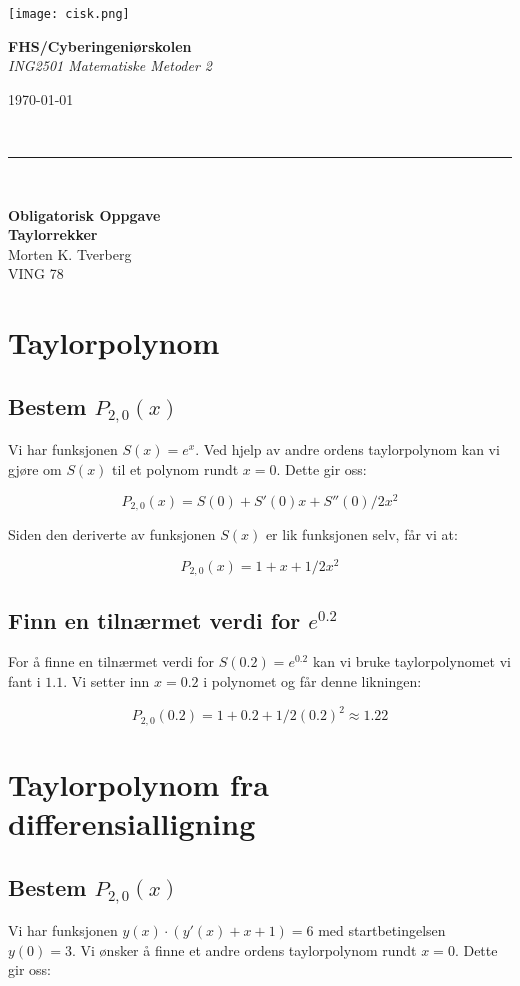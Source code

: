 \documentclass[12pt,a4paper]{article}
\def\frac#1#2{#1/#2}%
\newcommand{\institution}{FHS/Cyberingeniørskolen}
\newcommand{\coursecode}{ING2501 \; Matematiske Metoder 2}
\newcommand{\studentname}{Morten K. Tverberg}
\newcommand{\class}{VING 78}
\newcommand{\documenttitle}{Obligatorisk Oppgave}
\newcommand{\documentsubtitle}{Taylorrekker}
\newcommand{\makedoctitle}{%
  \thispagestyle{empty}
  \begin{minipage}{0.15\textwidth}
      \texttt{[image: cisk.png]}
  \end{minipage}%
  \begin{minipage}{0.5\textwidth}
      \vspace{10ex}
      {\bfseries \institution}\\
      {\itshape \coursecode}
  \end{minipage}%
  \begin{minipage}{0.3\textwidth}
      \vspace{13ex}
      \raggedleft
      \today 
  \end{minipage}\\[0.5ex]
  {\rule{\textwidth}{2pt}} \\ \vspace{3ex}

  \begin{center}
      {\Huge \bfseries \documenttitle} \\[1ex]
      {\LARGE \bfseries \documentsubtitle} \\[2ex]
      {\normalsize \studentname} \\[0.5ex]
      {\normalsize \class} \\[1ex]
  \end{center}

\clearpage
}
\begin{document}
\makedoctitle
{}
\setcounter{page}{1}

\tableofcontents
\clearpage

\section{Taylorpolynom}
\subsection{Bestem $P_{2,0}(x)$}
Vi har funksjonen $S(x)=e^x$. 
Ved hjelp av andre ordens taylorpolynom kan vi gjøre om $S(x)$ til et polynom rundt $x=0$. 
Dette gir oss:

\begin{equation*}
  P_{2,0}(x) = S(0) + S'(0)x + \frac{S''(0)}{2}x^2
\end{equation*} \vspace{1ex}


Siden den deriverte av funksjonen $S(x)$ er lik funksjonen selv, får vi at:

\begin{equation*}
  P_{2,0}(x) = 1 + x + \frac{1}{2}x^2
\end{equation*} \vspace{1ex}


\subsection{Finn en tilnærmet verdi for $e^{0.2}$}
For å finne en tilnærmet verdi for $S(0.2) = e^{0.2}$ kan vi bruke taylorpolynomet vi fant i $1.1$. 
Vi setter inn $x=0.2$ i polynomet og får denne likningen:

\begin{equation*}
  P_{2,0}(0.2) = 1 + 0.2 + \frac{1}{2}(0.2)^2 \approx 1.22
\end{equation*} \vspace{3ex}


\section{Taylorpolynom fra differensialligning}
\subsection{Bestem $P_{2,0}(x)$}
Vi har funksjonen $y(x)\cdot(y'(x)+x+1)=6$ med startbetingelsen $y(0)=3$. 
Vi ønsker å finne et andre ordens taylorpolynom rundt $x=0$. Dette gir oss:
\end{document}
